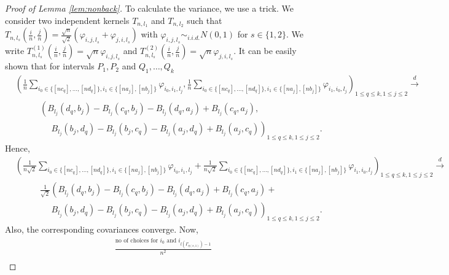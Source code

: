 \documentclass[reqno,12pt]{amsart}
\theoremstyle{plain}
\theoremstyle{definition}
\begin{document}
\begin{proof}[Proof of Lemma \ref{lem:nonback}]
To calculate the variance, we use a trick. We consider two independent kernels $T_{n,l_1}$ and $T_{n,l_2}$ such that $T_{n,l_{s}}\left( \frac{i}{n}, \frac{j}{n} \right)= \frac{\sqrt{n}}{\sqrt{2}} \left(\varphi_{i,j,l_s} + \varphi_{j,i,l_s}\right)$ with $\varphi_{i,j,l_s} \sim_{i.i.d.} N(0,1)$ for $s \in \{ 1,2 \}$. We write 
$T_{n,l_{s}}^{(1)}(\frac{i}{n},\frac{j}{n})= \sqrt{n} \varphi_{i,j,l_{s}}$ and $T_{n,l_{s}}^{(2)}(\frac{i}{n},\frac{j}{n})= \sqrt{n} \varphi_{j,i,l_{s}}$. It can be easily shown that for intervals $P_{1},P_{2}$ and $Q_{1},\ldots, Q_{k}$ 
\begin{equation}
\begin{split}
&\left(\frac{1}{n} \sum_{i_{0}\in \{[nc_{q}],\ldots,[nd_{q}]\}, i_{1} \in \{[na_{j}],[nb_{j}]\}} \varphi_{i_{0},i_{1},l_{j}}, \frac{1}{n} \sum_{i_{0}\in \{[nc_{q}],\ldots,[nd_{q}]\}, i_{1} \in \{[na_{j}],[nb_{j}]\}} \varphi_{i_{1},i_{0},l_{j}}\right)_{1\le q \le k, 1 \le j \le 2}\stackrel{d}{\to}\\
&~~~~~~~~~~~~~\left( B_{l_{j}}(d_{q},b_{j})- B_{l_{j}}(c_{q},b_{j})- B_{l_{j}}(d_{q},a_{j}) + B_{l_{j}}(c_{q},a_{j}), \right.\\
& ~~~~~~~~~~~~~~~~~~~\left. B_{l_{j}}(b_{j},d_{q})- B_{l_{j}}(b_{j},c_{q})- B_{l_{j}}(a_{j},d_{q}) + B_{l_{j}}(a_{j},c_{q}) \right)_{1\le q \le k, 1 \le j \le 2}.
\end{split}
\end{equation}
Hence,
\begin{equation}\label{eq:Gaucon}
\begin{split}
&\left(\frac{1}{n\sqrt{2}} \sum_{i_{0}\in \{[nc_{q}],\ldots,[nd_{q}]\}, i_{1} \in \{[na_{j}],[nb_{j}]\}} \varphi_{i_{0},i_{1},l_{j}}+ \frac{1}{n\sqrt{2}} \sum_{i_{0}\in \{[nc_{q}],\ldots,[nd_{q}]\},i_{1} \in \{[na_{j}],[nb_{j}]\}} \varphi_{i_{1},i_{0},l_{j}}\right)_{1\le q \le k, 1 \le j \le 2}\stackrel{d}{\to}\\
&~~~~~~~~~~~~~\frac{1}{\sqrt{2}}\left( B_{l_{j}}(d_{q},b_{j})- B_{l_{j}}(c_{q},b_{j})- B_{l_{j}}(d_{q},a_{j}) + B_{l_{j}}(c_{q},a_{j})+ \right.\\
& ~~~~~~~~~~~~~~~~~~~\left. B_{l_{j}}(b_{j},d_{q})- B_{l_{j}}(b_{j},c_{q})- B_{l_{j}}(a_{j},d_{q}) + B_{l_{j}}(a_{j},c_{q}) \right)_{1\le q \le k, 1 \le j \le 2}.
\end{split}
\end{equation}
Also, the corresponding covariances converge. Now, 
\begin{equation}\label{eq:varlim}
    \begin{split}
       &\frac{\text{no of choices for $i_{0}$ and $i_{l(\Gamma_{\eta(s,1)})-1}$}}{n^2}\\

\end{split}
\end{equation}
\end{proof}
\end{document}
